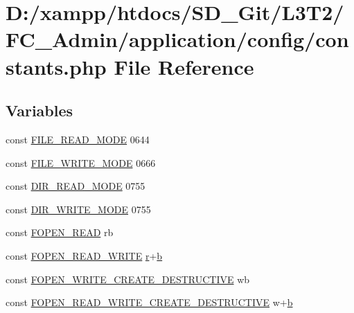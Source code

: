 \hypertarget{_admin_2application_2config_2constants_8php}{}\section{D\+:/xampp/htdocs/\+S\+D\+\_\+\+Git/\+L3\+T2/\+F\+C\+\_\+\+Admin/application/config/constants.php File Reference}
\label{_admin_2application_2config_2constants_8php}
\subsection*{Variables}
\begin{DoxyCompactItemize}
\item 
const \hyperlink{_admin_2application_2config_2constants_8php_afa80a675a7a8436c2b299e41c63fd405}{F\+I\+L\+E\+\_\+\+R\+E\+A\+D\+\_\+\+M\+O\+D\+E} 0644
\item 
const \hyperlink{_admin_2application_2config_2constants_8php_a6b9fcdc9259bf9361e8f97e289024242}{F\+I\+L\+E\+\_\+\+W\+R\+I\+T\+E\+\_\+\+M\+O\+D\+E} 0666
\item 
const \hyperlink{_admin_2application_2config_2constants_8php_a5eb43292f0c56482a7869db8adb1c91d}{D\+I\+R\+\_\+\+R\+E\+A\+D\+\_\+\+M\+O\+D\+E} 0755
\item 
const \hyperlink{_admin_2application_2config_2constants_8php_aac7345ea170768d48be7cde8ebf6b147}{D\+I\+R\+\_\+\+W\+R\+I\+T\+E\+\_\+\+M\+O\+D\+E} 0755
\item 
const \hyperlink{_admin_2application_2config_2constants_8php_ab6a0a1c6e9ea5f7625b2dba2f7bd286c}{F\+O\+P\+E\+N\+\_\+\+R\+E\+A\+D} \textquotesingle{}rb\textquotesingle{}
\item 
const \hyperlink{_admin_2application_2config_2constants_8php_ab98552969950ea978284c998e10d0153}{F\+O\+P\+E\+N\+\_\+\+R\+E\+A\+D\+\_\+\+W\+R\+I\+T\+E} \textquotesingle{}\hyperlink{_admin_2assets_2js_2jquery-1_811_82_8min_8js_a96f65b399314d93896076ceb474b6b9b}{r}+\hyperlink{_admin_2assets_2js_2bootstrap_8min_8js_a398bb8542498d1b14178b02b99df309b}{b}\textquotesingle{}
\item 
const \hyperlink{_admin_2application_2config_2constants_8php_a246692af603ceac463cab532d81a6048}{F\+O\+P\+E\+N\+\_\+\+W\+R\+I\+T\+E\+\_\+\+C\+R\+E\+A\+T\+E\+\_\+\+D\+E\+S\+T\+R\+U\+C\+T\+I\+V\+E} \textquotesingle{}wb\textquotesingle{}
\item 
const \hyperlink{_admin_2application_2config_2constants_8php_a1b8581dfce24061e847cc257aed23d62}{F\+O\+P\+E\+N\+\_\+\+R\+E\+A\+D\+\_\+\+W\+R\+I\+T\+E\+\_\+\+C\+R\+E\+A\+T\+E\+\_\+\+D\+E\+S\+T\+R\+U\+C\+T\+I\+V\+E} \textquotesingle{}w+\hyperlink{_admin_2assets_2js_2bootstrap_8min_8js_a398bb8542498d1b14178b02b99df309b}{b}\textquotesingle{}

\end{DoxyCompactItemize}
